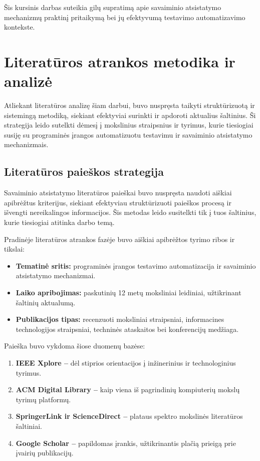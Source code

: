 \documentclass[
]{VUMIFPSkursinis}
\begin{document}
Šis kursinis darbas suteikia gilų supratimą apie savaiminio atsistatymo mechanizmų praktinį pritaikymą bei jų efektyvumą testavimo automatizavimo kontekste.

\section{Literatūros atrankos metodika ir analizė}

Atliekant literatūros analizę šiam darbui, buvo nuspręsta taikyti struktūrizuotą ir sistemingą metodiką, siekiant efektyviai surinkti ir apdoroti aktualius šaltinius. Ši strategija leido sutelkti dėmesį į mokslinius straipsnius ir tyrimus, kurie tiesiogiai susiję su programinės įrangos automatizuotu testavimu ir savaiminio atsistatymo mechanizmais.

\subsection{Literatūros paieškos strategija}

Savaiminio atsistatymo literatūros paieškai buvo nuspręsta naudoti aiškiai apibrėžtus kriterijus, siekiant efektyviau struktūrizuoti paieškos procesą ir išvengti nereikalingos informacijos. Šis metodas leido susitelkti tik į tuos šaltinius, kurie tiesiogiai atitinka darbo temą.

Pradinėje literatūros atrankos fazėje buvo aiškiai apibrėžtos tyrimo ribos ir tikslai:

\begin{itemize}
    \item \textbf{Tematinė sritis:} programinės įrangos testavimo automatizacija ir savaiminio atsistatymo mechanizmai.
    \item \textbf{Laiko apribojimas:} paskutinių 12 metų moksliniai leidiniai, užtikrinant šaltinių aktualumą.
    \item \textbf{Publikacijos tipas:} recenzuoti moksliniai straipsniai, informacines technologijos straipsniai, techninės ataskaitos bei konferencijų medžiaga.
\end{itemize}

Paieška buvo vykdoma šiose duomenų bazėse:

\begin{enumerate}
    \item \textbf{IEEE Xplore –} dėl stiprios orientacijos į inžinerinius ir technologinius tyrimus.
    \item \textbf{ACM Digital Library –} kaip viena iš pagrindinių kompiuterių mokslų tyrimų platformų.
    \item \textbf{SpringerLink ir ScienceDirect – } plataus spektro mokslinės literatūros šaltiniai.
    \item \textbf{Google Scholar –} papildomas įrankis, užtikrinantis plačią prieigą prie įvairių publikacijų.
\end{enumerate}
\end{document}

